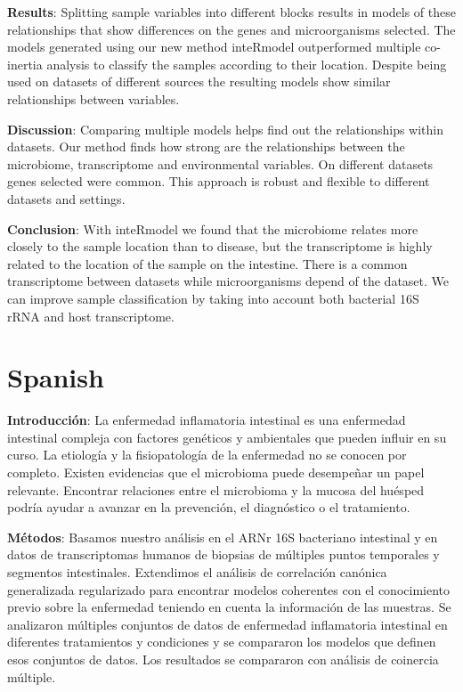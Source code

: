 \documentclass[
  12pt,
  a4paper,
  twoside,
  openright]{book}
\begin{document}
\textbf{Results}: Splitting sample variables into different blocks results in models of these relationships that show differences on the genes and microorganisms selected.
The models generated using our new method inteRmodel outperformed multiple co-inertia analysis to classify the samples according to their location.
Despite being used on datasets of different sources the resulting models show similar relationships between variables.

\textbf{Discussion}:
Comparing multiple models helps find out the relationships within datasets.
Our method finds how strong are the relationships between the microbiome, transcriptome and environmental variables.
On different datasets genes selected were common.
This approach is robust and flexible to different datasets and settings.

\textbf{Conclusion}: With inteRmodel we found that the microbiome relates more closely to the sample location than to disease, but the transcriptome is highly related to the location of the sample on the intestine.
There is a common transcriptome between datasets while microorganisms depend of the dataset.
We can improve sample classification by taking into account both bacterial 16S rRNA and host transcriptome.

\hypertarget{spanish}{%
\section*{Spanish}\label{spanish}}

\textbf{Introducción}: La enfermedad inflamatoria intestinal es una enfermedad intestinal compleja con factores genéticos y ambientales que pueden influir en su curso.
La etiología y la fisiopatología de la enfermedad no se conocen por completo.
Existen evidencias que el microbioma puede desempeñar un papel relevante.
Encontrar relaciones entre el microbioma y la mucosa del huésped podría ayudar a avanzar en la prevención, el diagnóstico o el tratamiento.

\textbf{Métodos}: Basamos nuestro análisis en el ARNr 16S bacteriano intestinal y en datos de transcriptomas humanos de biopsias de múltiples puntos temporales y segmentos intestinales.
Extendimos el análisis de correlación canónica generalizada regularizado para encontrar modelos coherentes con el conocimiento previo sobre la enfermedad teniendo en cuenta la información de las muestras.
Se analizaron múltiples conjuntos de datos de enfermedad inflamatoria intestinal en diferentes tratamientos y condiciones y se compararon los modelos que definen esos conjuntos de datos.
Los resultados se compararon con análisis de coinercia múltiple.
\end{document}
